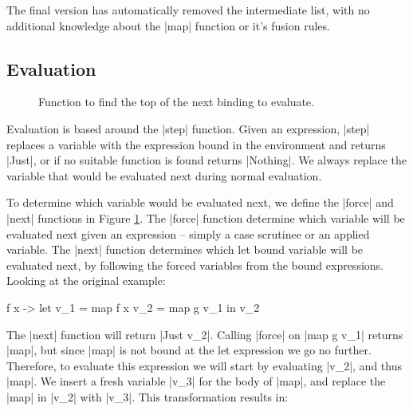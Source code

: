 \documentclass[draft]{sigplanconf}
\begin{document}
The final version has automatically removed the intermediate list, with no additional knowledge about the |map| function or it's fusion rules.

\subsection{Evaluation}
\label{sec:eval}

\begin{figure}
\caption{Function to find the top of the next binding to evaluate.}
\label{fig:stack}
\end{figure}

Evaluation is based around the |step| function. Given an expression, |step| replaces a variable with the expression bound in the environment and returns |Just|, or if no suitable function is found returns |Nothing|. We always replace the variable that would be evaluated next during normal evaluation.

To determine which variable would be evaluated next, we define the |force| and |next| functions in Figure \ref{fig:stack}. The |force| function determine which variable will be evaluated next given an expression -- simply a case scrutinee or an applied variable. The |next| function determines which let bound variable will be evaluated next, by following the forced variables from the bound expressions. Looking at the original example:

\begin{code}
\g f x ->  let  v_1 =  map f x
                v_2 =  map g v_1
           in   v_2
\end{code}

The |next| function will return |Just v_2|. Calling |force| on |map g v_1| returns |map|, but since |map| is not bound at the let expression we go no further. Therefore, to evaluate this expression we will start by evaluating |v_2|, and thus |map|. We insert a fresh variable |v_3| for the body of |map|, and replace the |map| in |v_2| with |v_3|. This transformation results in:
\end{document}
